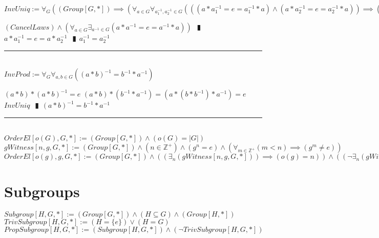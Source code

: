 \documentclass{book}
\newcommand{\abr}{:=}
\newcommand{\pipe}{$\phantom{(}\vrectangleblack\phantom{)}$}
\begin{document}
$InvUniq \abr \forall_{G}((Group[G, *]) \implies (\forall_{a \in G} \forall_{a_1^{-1}, a_2^{-1} \in G}(((a * a_1^{-1} = e = a_1^{-1} * a) \land (a * a_2^{-1} = e = a_2^{-1} * a)) \implies (a_1^{-1} = a_2^{-1}))))$
\begin{enumerate}
  \lit $(CancelLaws) \land (\forall_{a \in G} \exists_{a^{-1} \in G}(a * a^{-1} = e = a^{-1} * a))$ \pipe $a * a_1^{-1} = e = a * a_2^{-1}$ \pipe $a_1^{-1} = a_2^{-1}$
\end{enumerate} \vspace{.75mm} \hrule \vspace{.75mm} \ \\ 

$InvProd \abr \forall_{G} \forall_{a, b \in G}((a * b)^{-1} = b^{-1} * a^{-1})$
\begin{enumerate}
  \lit $(a * b) * (a * b)^{-1} = e$
  \lit $(a * b) * (b^{-1} * a^{-1}) = (a * (b * b^{-1}) * a^{-1}) = e$
  \lit $InvUniq$ \pipe $(a * b)^{-1} = b^{-1} * a^{-1}$
\end{enumerate} \vspace{.75mm} \hrule \vspace{.75mm} \ \\ 

$OrderEl[o(G), G, *] \abr (Group[G, *]) \land (o(G) = |G|)$ \\
$gWitness[n, g, G, *] \abr (Group[G, *]) \land (n \in \mathbb{Z}^+) \land (g^n = e) \land (\forall_{m \in \mathbb{Z}^+} (m < n) \implies (g^m \neq e))$ \\
$OrderEl[o(g), g, G, *] \abr (Group[G, *]) \land ((\exists_{n}(gWitness[n, g, G, *])) \implies (o(g) = n)) \land ((\lnot \exists_{n}(gWitness[n, g, G, *])) \implies (o(g) = \infty))$ \\


\section{Subgroups}
$Subgroup[H, G, *] \abr (Group[G, *]) \land (H \subseteq G) \land (Group[H, *])$ \\
$TrivSubgroup[H, G, *] \abr (H = \{e\}) \lor (H = G)$ \\
$PropSubgroup[H, G, *] \abr (Subgroup[H, G, *]) \land (\lnot TrivSubgroup[H, G, *])$ \\
\end{document}
